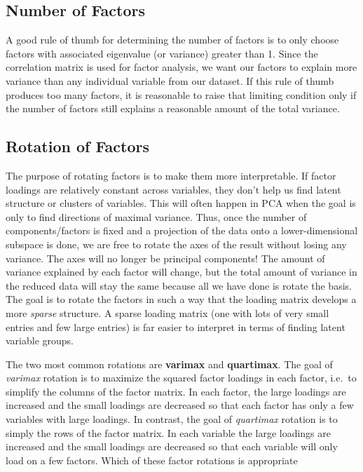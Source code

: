 \documentclass[
]{article}
\theoremstyle{definition}
\theoremstyle{definition}
\theoremstyle{definition}
\theoremstyle{definition}
\theoremstyle{remark}
\begin{document}
\hypertarget{number-of-factors}{%
\subsection{Number of Factors}\label{number-of-factors}}

A good rule of thumb for determining the number of factors is to only choose factors with associated eigenvalue (or variance) greater than 1. Since the correlation matrix is used for factor analysis, we want our factors to explain more variance than any individual variable from our dataset. If this rule of thumb produces too many factors, it is reasonable to raise that limiting condition only if the number of factors still explains a reasonable amount of the total variance.

\hypertarget{rotation-of-factors}{%
\subsection{Rotation of Factors}\label{rotation-of-factors}}

The purpose of rotating factors is to make them more interpretable. If factor loadings are relatively constant across variables, they don't help us find latent structure or clusters of variables. This will often happen in PCA when the goal is only to find directions of maximal variance. Thus, once the number of components/factors is fixed and a projection of the data onto a lower-dimensional subspace is done, we are free to rotate the axes of the result without losing any variance. The axes will no longer be principal components! The amount of variance explained by each factor will change, but the total amount of variance in the reduced data will stay the same because all we have done is rotate the basis. The goal is to rotate the factors in such a way that the loading matrix develops a more \emph{sparse} structure. A sparse loading matrix (one with lots of very small entries and few large entries) is far easier to interpret in terms of finding latent variable groups.

The two most common rotations are \textbf{varimax} and \textbf{quartimax}. The goal of \emph{varimax} rotation is to maximize the squared factor loadings in each factor, i.e.~to simplify the columns of the factor matrix. In each factor, the large loadings are increased and the small loadings are decreased so that each factor has only a few variables with large loadings. In contrast, the goal of \emph{quartimax} rotation is to simply the rows of the factor matrix. In each variable the large loadings are increased and the small loadings are decreased so that each variable will only load on a few factors. Which of these factor rotations is appropriate
\end{document}
